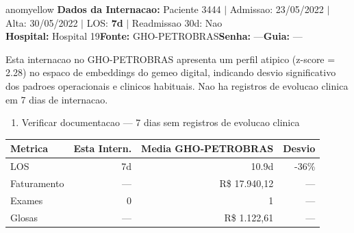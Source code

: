 \documentclass[a4paper,10pt]{article}
\begin{document}
\begin{anomalycard}[Internacao 3000 | GHO-PETROBRAS | MODERADO (z=2.28)]{anomyellow}
\textbf{Dados da Internacao:} Paciente 3444 $\mid$ Admissao: 23/05/2022 $\mid$ Alta: 30/05/2022 $\mid$ LOS: \textbf{7d} $\mid$ Readmissao 30d: Nao\\
\textbf{Hospital:} Hospital 19\quad\textbf{Fonte:} GHO-PETROBRAS\quad\textbf{Senha:} ---\quad\textbf{Guia:} ---\\
\vspace{2pt}\begin{tcolorbox}[colback=severityred!20,colframe=anomyellow,title={\textbf{Interpretacao de Negocio}},fonttitle=\bfseries\small,left=4pt,right=4pt,top=3pt,bottom=3pt]
{\small Esta internacao no GHO-PETROBRAS apresenta um perfil atipico (z-score = 2.28) no espaco de embeddings do gemeo digital, indicando desvio significativo dos padroes operacionais e clinicos habituais. Nao ha registros de evolucao clinica em 7 dias de internacao.}
\end{tcolorbox}
\begin{tcolorbox}[colback=severityyellow!30,colframe=anomorange,title={\textbf{Recomendacoes Especificas}},fonttitle=\bfseries\small,left=4pt,right=4pt,top=3pt,bottom=3pt]
\begin{enumerate}[nosep,leftmargin=16pt]
\item {\small Verificar documentacao --- 7 dias sem registros de evolucao clinica}
\end{enumerate}
\end{tcolorbox}
\begin{center}\begin{tabular}{l r r r}\toprule\textbf{Metrica} & \textbf{Esta Intern.} & \textbf{Media GHO-PETROBRAS} & \textbf{Desvio} \\\midrule
LOS & 7d & 10.9d & -36\% \\
Faturamento & --- & R\$ 17.940,12 & --- \\
Exames & 0 & 1 & --- \\
Glosas & --- & R\$ 1.122,61 & --- \\
\bottomrule\end{tabular}\end{center}


\end{anomalycard}
\end{document}
